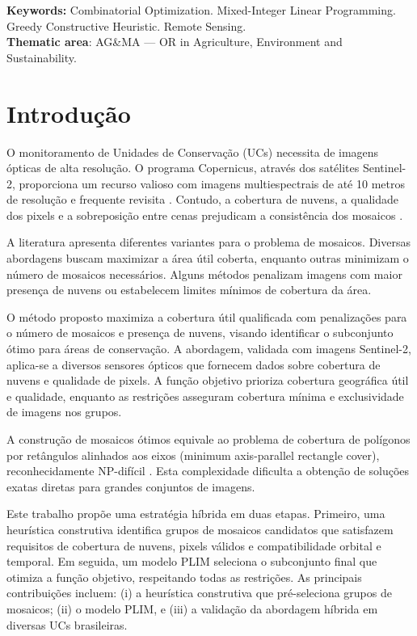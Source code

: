 \documentclass[a4paper,11pt]{article}
\begin{document}
\noindent
\textbf{Keywords:} Combinatorial Optimization. Mixed-Integer Linear Programming. Greedy Constructive Heuristic. Remote Sensing.\\
\noindent\textbf{Thematic area}: AG\&MA --- OR in Agriculture, Environment and Sustainability.
\newpage

\section{Introdução}
\vspace{-5mm}
O monitoramento de Unidades de Conservação (UCs) necessita de imagens ópticas de alta resolução. O programa Copernicus, através dos satélites Sentinel-2, proporciona um recurso valioso com imagens multiespectrais de até 10 metros de resolução e frequente revisita \citep{schuster:2020}. Contudo, a cobertura de nuvens, a qualidade dos pixels e a sobreposição entre cenas prejudicam a consistência dos mosaicos \citep{rodriguez-puerta:2024}.

A literatura apresenta diferentes variantes para o problema de mosaicos. Diversas abordagens buscam maximizar a área útil coberta, enquanto outras minimizam o número de mosaicos necessários. Alguns métodos penalizam imagens com maior presença de nuvens ou estabelecem limites mínimos de cobertura da área.

O método proposto maximiza a cobertura útil qualificada com penalizações para o número de mosaicos e presença de nuvens, visando identificar o subconjunto ótimo para áreas de conservação. A abordagem, validada com imagens Sentinel-2, aplica-se a diversos sensores ópticos que fornecem dados sobre cobertura de nuvens e qualidade de pixels. A função objetivo prioriza cobertura geográfica útil e qualidade, enquanto as restrições asseguram cobertura mínima e exclusividade de imagens nos grupos.

A construção de mosaicos ótimos equivale ao problema de cobertura de polígonos por retângulos
alinhados aos eixos (minimum axis-parallel rectangle cover), reconhecidamente NP-difícil \citep{KumarRamesh1995}. Esta complexidade dificulta a obtenção de soluções exatas diretas para
grandes conjuntos de imagens.

Este trabalho propõe uma estratégia híbrida em duas etapas. Primeiro, uma heurística construtiva identifica grupos de mosaicos candidatos que satisfazem requisitos de cobertura de nuvens, pixels válidos e compatibilidade orbital e temporal. Em seguida, um modelo PLIM seleciona o subconjunto final que otimiza a função objetivo, respeitando todas as restrições. As principais contribuições incluem: (i) a heurística construtiva que pré-seleciona grupos de mosaicos; (ii) o modelo PLIM, e (iii) a validação da abordagem híbrida em diversas UCs brasileiras.
\end{document}
